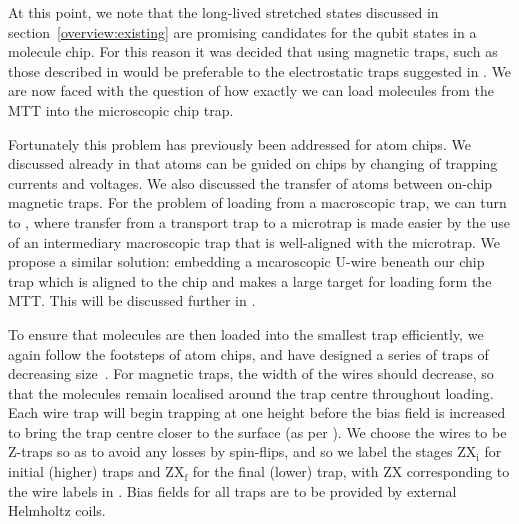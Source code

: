 At this point, we note that the long-lived stretched states discussed in
section~\ref{overview:existing} are promising candidates for the qubit states
in a molecule chip. For this reason it was decided that using magnetic traps,
such as those described in  would be preferable to the
electrostatic traps suggested in . We are now faced with
the question of how exactly we can load molecules from the MTT into the
microscopic chip trap.

Fortunately this problem has previously been addressed for atom chips. We
discussed already in  that atoms can be guided on chips by
changing of trapping currents and voltages. We also discussed the transfer of
atoms between on-chip magnetic traps. For the problem of loading from a
macroscopic trap, we can turn to , where transfer from a
transport trap to a microtrap is made easier by the use of an intermediary
macroscopic trap that is well-aligned with the microtrap.
We propose a similar solution: embedding a mcaroscopic U-wire beneath our chip
trap which is aligned to the chip and makes a large target for loading form the
MTT.  This will be discussed further in .

To ensure that molecules are then loaded into the smallest trap efficiently, we
again follow the footsteps of atom chips, and have designed  a series of traps
of decreasing size~\cite{Reichel1999}. For magnetic traps, the width of the
wires should decrease, so that the molecules remain localised around
the trap centre throughout loading. 
%
Each wire trap will begin trapping at one height before the bias field is
increased to bring the trap centre closer to the surface (as per
). We choose the wires to be Z-traps so as to avoid
any losses by spin-flips, and so we label the stages $\mathrm{ZX_i}$ for
initial (higher) traps and $\mathrm{ZX_f}$ for the final (lower) trap, with
$\mathrm{ZX}$ corresponding to the wire labels in
. Bias fields for all traps are to be provided
by external Helmholtz coils.

